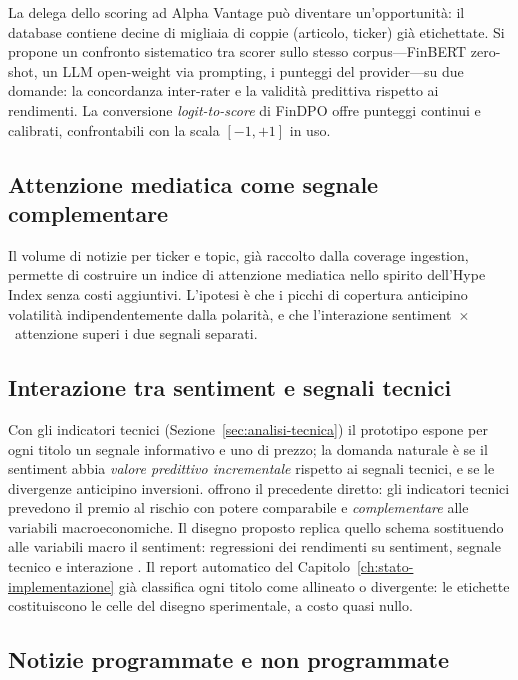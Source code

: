 La delega dello scoring ad Alpha Vantage può diventare un'opportunità: il database contiene decine di migliaia di coppie (articolo, ticker) già etichettate.
Si propone un confronto sistematico tra scorer sullo stesso corpus---FinBERT zero-shot, un LLM open-weight via prompting, i punteggi del provider---su due domande: la concordanza inter-rater e la validità predittiva rispetto ai rendimenti.
La conversione \textit{logit-to-score} di FinDPO \parencite{iacovides2025findpo} offre punteggi continui e calibrati, confrontabili con la scala $[-1, +1]$ in uso.

\subsection{Attenzione mediatica come segnale complementare}

Il volume di notizie per ticker e topic, già raccolto dalla coverage ingestion, permette di costruire un indice di attenzione mediatica nello spirito dell'Hype Index \parencite{cao2025hypeindexnlpdrivenmeasure} senza costi aggiuntivi.
L'ipotesi è che i picchi di copertura anticipino volatilità indipendentemente dalla polarità, e che l'interazione sentiment~$\times$~attenzione superi i due segnali separati.

\subsection{Interazione tra sentiment e segnali tecnici}

Con gli indicatori tecnici (Sezione~\ref{sec:analisi-tecnica}) il prototipo espone per ogni titolo un segnale informativo e uno di prezzo; la domanda naturale è se il sentiment abbia \emph{valore predittivo incrementale} rispetto ai segnali tecnici, e se le divergenze anticipino inversioni.
\textcite{neely2014forecasting} offrono il precedente diretto: gli indicatori tecnici prevedono il premio al rischio con potere comparabile e \emph{complementare} alle variabili macroeconomiche.
Il disegno proposto replica quello schema sostituendo alle variabili macro il sentiment: regressioni dei rendimenti su sentiment, segnale tecnico e interazione \parencite{brock1992simple}.
Il report automatico del Capitolo~\ref{ch:stato-implementazione} già classifica ogni titolo come allineato o divergente: le etichette costituiscono le celle del disegno sperimentale, a costo quasi nullo.

\subsection{Notizie programmate e non programmate}

